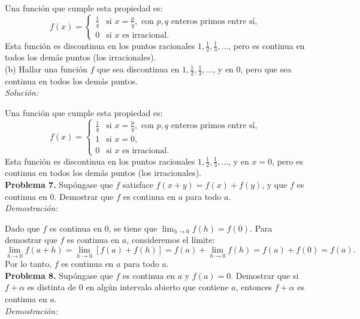 Una función que cumple esta propiedad es:
\[
    f(x) = \begin{cases}
    \frac{1}{q} & \text{si } x = \frac{p}{q}, \text{ con } p, q \text{ enteros primos entre sí}, \\
    0 & \text{si } x \text{ es irracional}.
    \end{cases}
\]
Esta función es discontinua en los puntos racionales $1, \frac{1}{2}, \frac{1}{3}, \dots$, pero es continua en todos los demás puntos (los irracionales).\\

(b) Hallar una función $f$ que sea discontinua en $1, \frac{1}{2}, \frac{1}{3}, \dots$, y en $0$, pero que sea continua en todos los demás puntos.\\

\textit{Solución:}

Una función que cumple esta propiedad es:
\[
    f(x) = \begin{cases}
    \frac{1}{q} & \text{si } x = \frac{p}{q}, \text{ con } p, q \text{ enteros primos entre sí}, \\
    1 & \text{si } x = 0, \\
    0 & \text{si } x \text{ es irracional}.
    \end{cases}
\]
Esta función es discontinua en los puntos racionales $1, \frac{1}{2}, \frac{1}{3}, \dots$, y en $x = 0$, pero es continua en todos los demás puntos (los irracionales).\\

\textbf{Problema 7.}
Supóngase que $f$ satisface $f(x + y) = f(x) + f(y)$, y que $f$ es continua en $0$. Demostrar que $f$ es continua en $a$ para todo $a$.\\

\textit{Demostración:}

Dado que $f$ es continua en $0$, se tiene que $\lim_{h \to 0} f(h) = f(0)$. Para demostrar que $f$ es continua en $a$, consideremos el límite:
\[
\lim_{h \to 0} f(a + h) = \lim_{h \to 0} [f(a) + f(h)] = f(a) + \lim_{h \to 0} f(h) = f(a) + f(0) = f(a).
\]
Por lo tanto, $f$ es continua en $a$ para todo $a$.\\

\textbf{Problema 8.}
Supóngase que $f$ es continua en $a$ y $f(a) = 0$. Demostrar que si $f + \alpha$ es distinta de $0$ en algún intervalo abierto que contiene $a$, entonces $f + \alpha$ es continua en $a$.\\

\textit{Demostración:}

